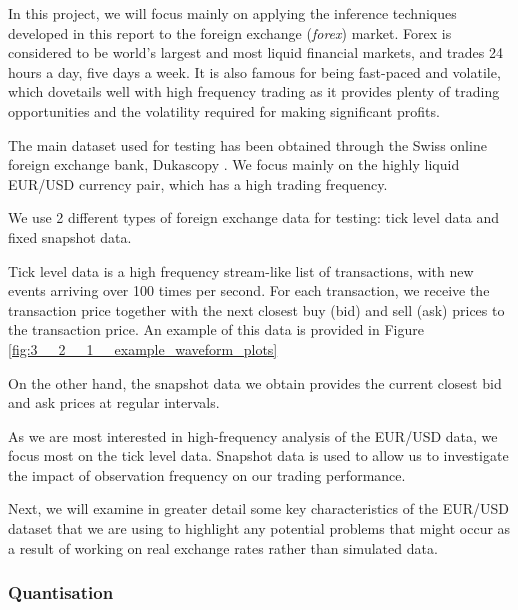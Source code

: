 \documentclass[../main.tex]{subfiles}
\begin{document}
	
In this project, we will focus mainly on applying the inference techniques developed in this report to the foreign exchange (\textit{forex}) market. Forex is considered to be world's largest and most liquid financial markets, and trades 24 hours a day, five days a week. It is also famous for being fast-paced and volatile, which dovetails well with high frequency trading as it provides plenty of trading opportunities and the volatility required for making significant profits. 
	
The main dataset used for testing has been obtained through the Swiss online foreign exchange bank, Dukascopy \cite{Dukascopy}. We focus mainly on the highly liquid EUR/USD currency pair, which has a high trading frequency.

We use 2 different types of foreign exchange data for testing: tick level data and fixed snapshot data. 

Tick level data is a high frequency stream-like list of transactions, with new events arriving over 100 times per second. For each transaction, we receive the transaction price together with the next closest buy (bid) and sell (ask) prices to the transaction price. An example of this data is provided in Figure \ref{fig:3__2__1__example_waveform_plots}

On the other hand, the snapshot data we obtain provides the current closest bid and ask prices at regular intervals. 

As we are most interested in high-frequency analysis of the EUR/USD data, we focus most on the tick level data. Snapshot data is used to allow us to investigate the impact of observation frequency on our trading performance. 

Next, we will examine in greater detail some key characteristics of the EUR/USD dataset that we are using to highlight any potential problems that might occur as a result of working on real exchange rates rather than simulated data. 

\subsubsection{Quantisation}
\end{document}
